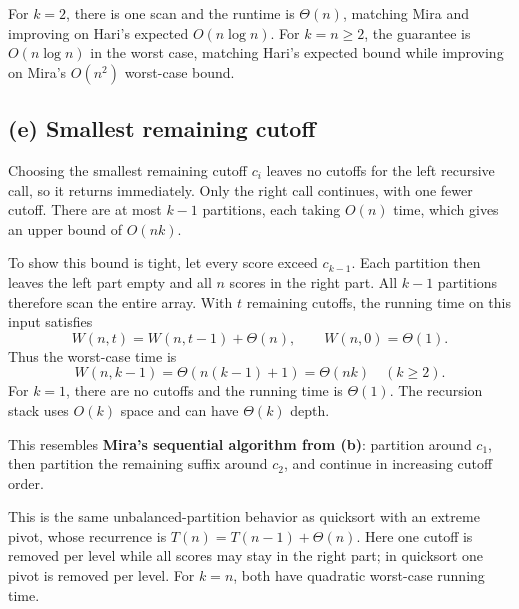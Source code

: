 \documentclass[11pt,a4paper]{article}
\newcommand{\parttitle}[1]{\Needspace{10\baselineskip}\subsection*{#1}}
\begin{document}
For $k=2$, there is one scan and the runtime is $\Theta(n)$, matching Mira and improving on Hari's expected $O(n\log n)$. For $k=n\ge2$, the guarantee is $O(n\log n)$ in the worst case, matching Hari's expected bound while improving on Mira's $O(n^2)$ worst-case bound.

\parttitle{(e) Smallest remaining cutoff}
Choosing the smallest remaining cutoff $c_i$ leaves no cutoffs for the left recursive call, so it returns immediately. Only the right call continues, with one fewer cutoff. There are at most $k-1$ partitions, each taking $O(n)$ time, which gives an upper bound of $O(nk)$.

To show this bound is tight, let every score exceed $c_{k-1}$. Each partition then leaves the left part empty and all $n$ scores in the right part. All $k-1$ partitions therefore scan the entire array. With $t$ remaining cutoffs, the running time on this input satisfies
\[
W(n,t)=W(n,t-1)+\Theta(n),\qquad W(n,0)=\Theta(1).
\]
Thus the worst-case time is
\[
\boxed{W(n,k-1)=\Theta(n(k-1)+1)=\Theta(nk)\quad(k\ge2).}
\]
For $k=1$, there are no cutoffs and the running time is $\Theta(1)$. The recursion stack uses $O(k)$ space and can have $\Theta(k)$ depth.

This resembles \textbf{Mira's sequential algorithm from (b)}: partition around $c_1$, then partition the remaining suffix around $c_2$, and continue in increasing cutoff order.

This is the same unbalanced-partition behavior as quicksort with an extreme pivot, whose recurrence is $T(n)=T(n-1)+\Theta(n)$. Here one cutoff is removed per level while all scores may stay in the right part; in quicksort one pivot is removed per level. For $k=n$, both have quadratic worst-case running time.
\end{document}
